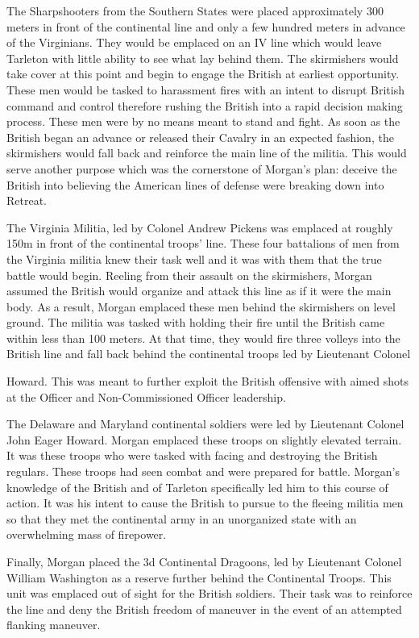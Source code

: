 The Sharpshooters from the Southern States were placed approximately 300 meters
in front of the continental line \cite[48]{moncure_cowpens_1996} and only a few
hundred meters in advance of the Virginians. They would be emplaced on an IV
line which would leave Tarleton with little ability to see what lay behind
them. The skirmishers would take cover at this point and begin to engage the
British at earliest opportunity. These men would be tasked to harassment fires
with an intent to disrupt British command and control therefore rushing the
British into a rapid decision making process. These men were by no means meant
to stand and fight.  As soon as the British began an advance or released their
Cavalry in an expected fashion, the skirmishers would fall back and reinforce
the main line of the militia. This would serve another purpose which was the
cornerstone of Morgan's plan: deceive the British into believing the American
lines of defense were breaking down into Retreat.

The Virginia Militia, led by Colonel Andrew Pickens was emplaced at roughly
150m in front of the continental troops' line. These four battalions of men
from the Virginia militia knew their task well and it was with them that the
true battle would begin. Reeling from their assault on the skirmishers, Morgan
assumed the British would organize and attack this line as if it were the main
body. As a result, Morgan emplaced these men behind the skirmishers on level
ground. The militia was tasked with holding their fire until the British came
within less than 100 meters. At that time, they would fire three volleys into
the British line and fall back behind the continental troops led by Lieutenant
Colonel

Howard. This was meant to further exploit the British offensive with aimed
shots at the Officer and Non-Commissioned Officer leadership.

The Delaware and Maryland continental soldiers were led by Lieutenant Colonel
John Eager Howard. Morgan emplaced these troops on slightly elevated terrain.
It was these troops who were tasked with facing and destroying the British
regulars. These troops had seen combat and were prepared for battle. Morgan's
knowledge of the British and of Tarleton specifically led him to this course of
action. It was his intent to cause the British to pursue to the fleeing militia
men so that they met the continental army in an unorganized state with an
overwhelming mass of firepower.

Finally, Morgan placed the 3d Continental Dragoons, led by Lieutenant Colonel
William Washington as a reserve further behind the Continental Troops. This
unit was emplaced out of sight for the British soldiers. Their task was to
reinforce the line and deny the British freedom of maneuver in the event of an
attempted flanking maneuver.

